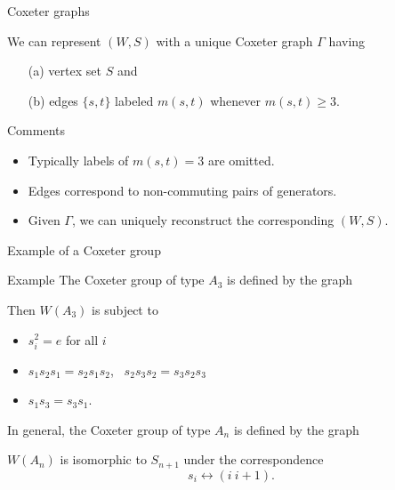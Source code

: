 \documentclass[9pt,handout]{beamer}
\begin{document}
\begin{frame}{Coxeter graphs}
\begin{definition} We can represent $(W,S)$ with a unique \alert{Coxeter graph} $\Gamma$ having \begin{enumerate}
    \item[(a)] vertex set $S$ and
    \item[(b)] edges $\{s,t\}$ labeled $m(s,t)$ whenever $m(s,t)\geq 3$.
\end{enumerate}
\end{definition}
    \pause
\begin{block}{Comments}
\begin{itemize}
\item Typically labels of $m(s,t)=3$ are omitted.
\item Edges correspond to non-commuting pairs of generators.
\item Given $\Gamma$, we can uniquely reconstruct the corresponding $(W,S)$.
\end{itemize}
\end{block}

\end{frame}


\begin{frame}{Example of a Coxeter group}
\begin{block}{Example}
    The Coxeter group of type $A_3$ is defined by the graph
\begin{center} 
\end{center}

    Then $W(A_{3})$ is subject to
\begin{itemize}
\item $s_{i}^{2}=e$ for all $i$
\item $s_{1}s_{2}s_{1}=s_{2}s_{1}s_{2}$,~ $s_{2}s_{3}s_{2}=s_{3}s_{2}s_{3}$
\item $s_{1}s_{3}=s_{3}s_{1}$.
\end{itemize}

    \pause
    In general, the Coxeter group of type $A_n$ is defined by the graph
\begin{center}
\end{center}

    $W(A_n)$ is isomorphic to $S_{n+1}$ under the correspondence $$s_i \longleftrightarrow (i~i+1).$$
\end{block}
\end{frame}
\end{document}

